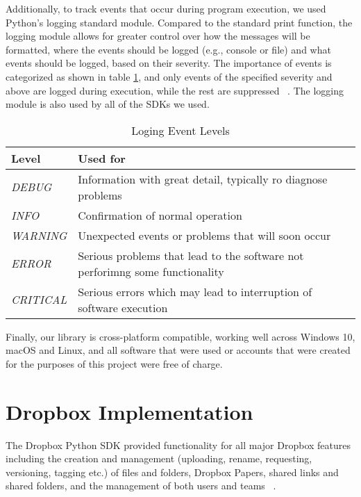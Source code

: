 Additionally, to track events that occur during program execution, we used Python's logging standard module. Compared to the standard print function, the logging module allows for greater control over how the messages will be formatted, where the events should be logged (e.g., console or file) and what events should be logged, based on their severity. The importance of events is categorized as shown in table \ref{tab:Logging_Levels}, and only events of the specified severity and above are logged during execution, while the rest are suppressed ~\cite{python_logging}. The logging module is also used by all of the SDKs we used.

\begin{table}[!h]
    \centering
    \begin{tabular}{|l|l|}
        \hline
        \rowcolor[HTML]{EFEFEF}
        \textbf{Level} & \textbf{Used for}                \\ \hline
        \textit{DEBUG}    & Information with great detail, typically ro diagnose problems                \\ \hline
        \textit{INFO}  & Confirmation of normal operation \\ \hline
        \textit{WARNING}  & Unexpected events or problems that will soon occur                           \\ \hline
        \textit{ERROR}    & Serious problems that lead to the software not perforimng some functionality \\ \hline
        \textit{CRITICAL} & Serious errors which may lead to interruption of software execution          \\ \hline
    \end{tabular}
    \caption{Loging Event Levels}
    \label{tab:Logging_Levels}
\end{table}

Finally, our library is cross-platform compatible, working well across Windows 10, macOS and Linux, and all software that were used or accounts that were created for the purposes of this project were free of charge.

\section{Dropbox Implementation}
The Dropbox Python SDK provided functionality for all major Dropbox features including the creation and management (uploading, rename, requesting, versioning, tagging etc.)  of files and folders, Dropbox Papers, shared links and shared folders, and the management of both users and teams ~\cite{dropbox_docs}. 

